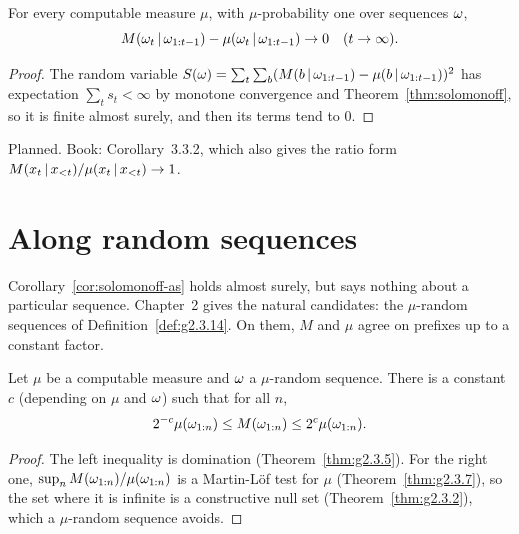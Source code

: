 \begin{corollary}\label{cor:solomonoff-as}
For every computable measure \( \mu \), with \( \mu \)-probability one over sequences
\( \omega \),
 \[
   M(\omega_{t} \,\vert\, \omega_{1:t-1}) - \mu(\omega_{t} \,\vert\, \omega_{1:t-1}) \to 0
   \quad (t \to \infty).
 \]
\end{corollary}
\begin{proof}
The random variable \( S(\omega) = \sum_{t} \sum_{b} (M(b \,\vert\, \omega_{1:t-1}) -
\mu(b \,\vert\, \omega_{1:t-1}))^{2} \) has expectation \( \sum_{t} s_{t} < \infty \) by
monotone convergence and Theorem~\ref{thm:solomonoff}, so it is finite almost surely, and
then its terms tend to \( 0 \).
\end{proof}

\begin{formalization}
Planned. Book: Corollary~3.3.2, which also gives the ratio form
\( M(x_{t} \,\vert\, x_{<t})/\mu(x_{t} \,\vert\, x_{<t}) \to 1 \).
\end{formalization}

\section{Along random sequences}

Corollary~\ref{cor:solomonoff-as} holds almost surely, but says nothing about a
particular sequence. Chapter~2 gives the natural candidates: the \( \mu \)-random
sequences of Definition~\ref{def:g2.3.14}. On them, \( M \) and \( \mu \) agree on
prefixes up to a constant factor.

\begin{theorem}
\label{thm:sol-comparable}
\leanok
{}
Let \( \mu \) be a computable measure and \( \omega \) a \( \mu \)-random sequence. There is a
constant \( c \) (depending on \( \mu \) and \( \omega \)) such that for all \( n \),
 \[
   2^{-c}\mu(\omega_{1:n}) \le M(\omega_{1:n}) \le 2^{c}\mu(\omega_{1:n}).
 \]
\end{theorem}
\begin{proof}
\leanok
{}
The left inequality is domination (Theorem~\ref{thm:g2.3.5}). For the right one,
\( \sup_{n} M(\omega_{1:n})/\mu(\omega_{1:n}) \) is a Martin-L\"of test for \( \mu \)
(Theorem~\ref{thm:g2.3.7}), so the set where it is infinite is a constructive null set
(Theorem~\ref{thm:g2.3.2}), which a \( \mu \)-random sequence avoids.
\end{proof}

